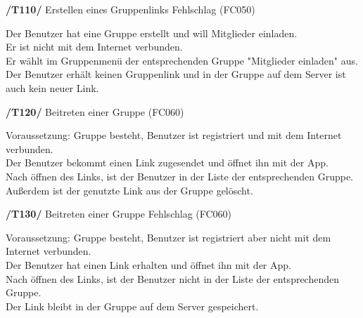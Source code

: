 \textbf{/T110/} Erstellen eines Gruppenlinks Fehlschlag (FC050)\\
\begin{center}
\vspace{-\parskip}
\begin{minipage}[t]{0.9\textwidth}
Der Benutzer hat eine Gruppe erstellt und will Mitglieder einladen.            \\
Er ist nicht mit dem Internet verbunden.                                        \\
Er wählt im Gruppenmenü der entsprechenden Gruppe "Mitglieder einladen" aus.     \\
Der Benutzer erhält keinen Gruppenlink und in der Gruppe auf dem Server ist auch kein neuer Link.\\
\end{minipage}
\end{center}

\textbf{/T120/} Beitreten einer Gruppe (FC060)\\
\begin{center}
\vspace{-\parskip}
\begin{minipage}[t]{0.9\textwidth}
Voraussetzung: Gruppe besteht, Benutzer ist registriert und mit dem Internet verbunden. \\
Der Benutzer bekommt einen Link zugesendet und öffnet ihn mit der App.                   \\
Nach öffnen des Links, ist der Benutzer in der Liste der entsprechenden Gruppe.           \\
Außerdem ist der genutzte Link aus der Gruppe gelöscht.                                    \\
\end{minipage}
\end{center}

\textbf{/T130/} Beitreten einer Gruppe Fehlschlag (FC060)\\
\begin{center}
\vspace{-\parskip}
\begin{minipage}[t]{0.9\textwidth}
Voraussetzung: Gruppe besteht, Benutzer ist registriert aber nicht mit dem Internet verbunden.\\
Der Benutzer hat einen Link erhalten und öffnet ihn mit der App.                               \\
Nach öffnen des Links, ist der Benutzer nicht in der Liste der entsprechenden Gruppe.           \\
Der Link bleibt in der Gruppe auf dem Server gespeichert.                                        \\
\end{minipage}
\end{center}

